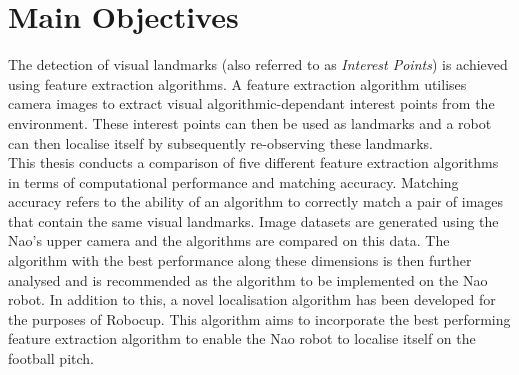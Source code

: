 \documentclass[11pt]{report}
\begin{document}
\section{Main Objectives}
\label{sec:objectives}
The detection of visual landmarks (also referred to as \textit{Interest Points}) is achieved using feature extraction algorithms. A feature extraction algorithm utilises camera images to extract visual algorithmic-dependant interest points from the environment. These interest points can then be used as landmarks and a robot can then localise itself by subsequently re-observing these landmarks. \\

This thesis conducts a comparison of five different feature extraction algorithms in terms of computational performance and matching accuracy. Matching accuracy refers to the ability of an algorithm to correctly match a pair of images that contain the same visual landmarks. Image datasets are generated using the Nao's upper camera and the algorithms are compared on this data. The algorithm with the best performance along these dimensions is then further analysed and is recommended as the algorithm to be implemented on the Nao robot. In addition to this, a novel localisation algorithm has been developed for the purposes of Robocup. This algorithm aims to incorporate the best performing feature extraction algorithm to enable the Nao robot to localise itself on the football pitch.\\
\end{document}
